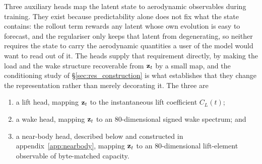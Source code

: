 Three auxiliary heads map the latent state to aerodynamic observables during training. They exist because predictability alone does not fix what the state contains: the rollout term rewards any latent whose own evolution is easy to forecast, and the regulariser only keeps that latent from degenerating, so neither requires the state to carry the aerodynamic quantities a user of the model would want to read out of it. The heads supply that requirement directly, by making the load and the wake structure recoverable from $\mathbf{z}_t$ by a small map, and the conditioning study of \S\ref{sec:res_construction} is what establishes that they change the representation rather than merely decorating it. The three are
\setlength{\listtextleftmargin}{1.6em}\begin{enumerate}
  \item a lift head, mapping $\mathbf{z}_t$ to the instantaneous lift coefficient $C_L(t)$;
  \item a wake head, mapping $\mathbf{z}_t$ to an $80$-dimensional signed wake spectrum; and
  \item a near-body head, described below and constructed in appendix~\ref{app:nearbody}, mapping $\mathbf{z}_t$ to an $80$-dimensional lift-element observable of byte-matched capacity.
\end{enumerate}
